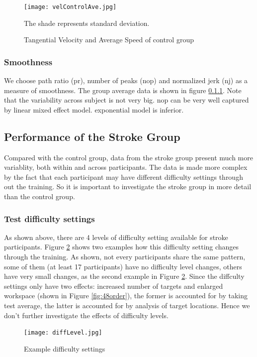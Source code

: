\begin{figure}
	\texttt{[image: velControlAve.jpg]}
	\centering
	\caption{Tangential Velocity and Average Speed of control group}
	\medskip
	\small The shade represents standard deviation.
	\label{fig:velControlAve}
\end{figure}

\subsubsection{Smoothness}
We choose path ratio (pr), number of peaks (nop) and normalized jerk (nj) as a measure of smoothness. The group average data is shown in figure \ref{}. Note that the variability across subject is not very big. nop can be very well captured by linear mixed effect model. exponential model is inferior. 

\subsection{Performance of the Stroke Group}

Compared with the control group, data from the stroke group present much more variablity, both within and across participants. The data is made more complex by the fact that each participant may have different difficulty settings through out the training. So it is important to investigate the stroke group in more detail than the control group.



\subsubsection{Test difficulty settings}

As shown above, there are 4 levels of difficulty setting available for stroke participants. Figure \ref{fig:diffLevel} shows two examples how this difficulty setting changes through the training. As shown, not every participants share the same pattern, some of them (at least 17 participants) have no difficulty level changes, others have very small changes, as the second example in Figure \ref{fig:diffLevel}. Since the diffculty settings only have two effects: increased number of targets and enlarged workspace (shown in Figure \ref{fig:48order}), the former is accounted for by taking test average, the latter is accounted for by analysis of target locations. Hence we don't further investigate the effects of difficulty levels.

\begin{figure}
	\texttt{[image: diffLevel.jpg]}
	\centering
	\caption{Example difficulty settings}
	\medskip
	\small 
	\label{fig:diffLevel}
\end{figure}

